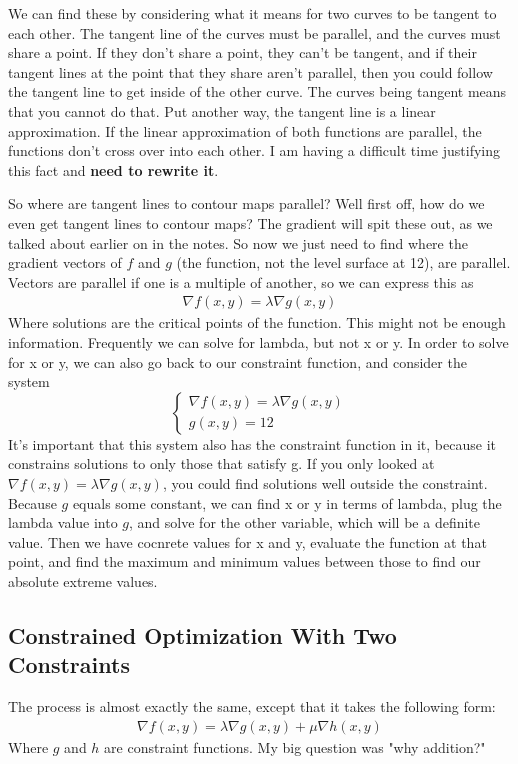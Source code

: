 \documentclass[12pt, letterpaper]{article}
\begin{document}
We can find these by considering what it means for two curves to be tangent to each other. 
The tangent line of the curves must be parallel, and the curves must share a point.
If they don't share a point, they can't be tangent, and if their tangent lines at the point that they share aren't parallel, then you could follow the tangent line to get inside of the other curve.
The curves being tangent means that you cannot do that. 
Put another way, the tangent line is a linear approximation. 
If the linear approximation of both functions are parallel, the functions don't cross over into each other. 
I am having a difficult time justifying this fact and \textbf{need to rewrite it}.

So where are tangent lines to contour maps parallel? 
Well first off, how do we even get tangent lines to contour maps?
The gradient will spit these out, as we talked about earlier on in the notes.
So now we just need to find where the gradient vectors of $f$ and $g$ (the function, not the level surface at 12), are parallel.
Vectors are parallel if one is a multiple of another, so we can express this as
\begin{gather*}
    \nabla f(x, y) = \lambda \nabla g(x, y)
\end{gather*}
Where solutions are the critical points of the function.
This might not be enough information.
Frequently we can solve for lambda, but not x or y.
In order to solve for x or y, we can also go back to our constraint function, and consider the system
\begin{displaymath}
    \begin{cases}
        \nabla f(x, y) = \lambda \nabla g(x, y) \\
        g(x, y) = 12
    \end{cases} 
\end{displaymath}
It's important that this system also has the constraint function in it, because it constrains solutions to only those that satisfy g.
If you only looked at $\nabla f(x, y) = \lambda \nabla g(x, y)$, you could find solutions well outside the constraint.
Because $g$ equals some constant, we can find x or y in terms of lambda, plug the lambda value into $g$, and solve for the other variable, which will be a definite value.
Then we have cocnrete values for x and y, evaluate the function at that point, and find the maximum and minimum values between those to find our absolute extreme values.

\subsection{Constrained Optimization With Two Constraints}
The process is almost exactly the same, except that it takes the following form:
\begin{gather*}
    \nabla f(x, y) = \lambda \nabla g(x, y) + \mu \nabla h(x, y)
\end{gather*}
Where $g$ and $h$ are constraint functions. My big question was "why addition?"
\end{document}
